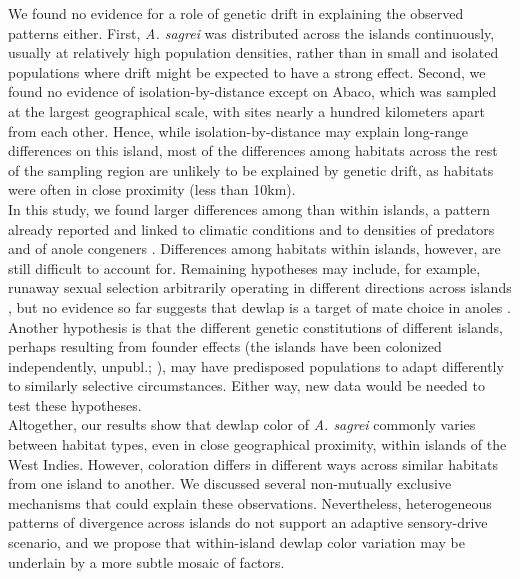 We found no evidence for a role of genetic drift in explaining the observed patterns either. First, \textit{A. sagrei} was distributed across the islands continuously, usually at relatively high population densities, rather than in small and isolated populations where drift might be expected to have a strong effect. Second, we found no evidence of isolation-by-distance except on Abaco, which was sampled at the largest geographical scale, with sites nearly a hundred kilometers apart from each other. Hence, while isolation-by-distance may explain long-range differences on this island, most of the differences among habitats across the rest of the sampling region are unlikely to be explained by genetic drift, as habitats were often in close proximity (less than 10km).\\

In this study, we found larger differences among than within islands, a pattern already reported and linked to climatic conditions \citep{Vanhooydonck2009} and to densities of predators and of anole congeners \citep{Baeckens2018}. Differences among habitats within islands, however, are still difficult to account for. Remaining hypotheses may include, for example, runaway sexual selection arbitrarily operating in different directions across islands \citep{Andersson1994}, but no evidence so far suggests that dewlap is a target of mate choice in anoles \citep{Tokarz2002, Tokarz2005, Nicholson2007}. Another hypothesis is that the different genetic constitutions of different islands, perhaps resulting from founder effects (the islands have been colonized independently, \citealt{vandeSchoot2016} unpubl.; \citealt{Driessens2017, Reynolds2020}), may have predisposed populations to adapt differently to similarly selective circumstances. Either way, new data would be needed to test these hypotheses.\\

Altogether, our results show that dewlap color of \textit{A. sagrei} commonly varies between habitat types, even in close geographical proximity, within islands of the West Indies. However, coloration differs in different ways across similar habitats from one island to another. We discussed several non-mutually exclusive mechanisms that could explain these observations. Nevertheless, heterogeneous patterns of divergence across islands do not support an adaptive sensory-drive scenario, and we propose that within-island dewlap color variation may be underlain by a more subtle mosaic of factors.